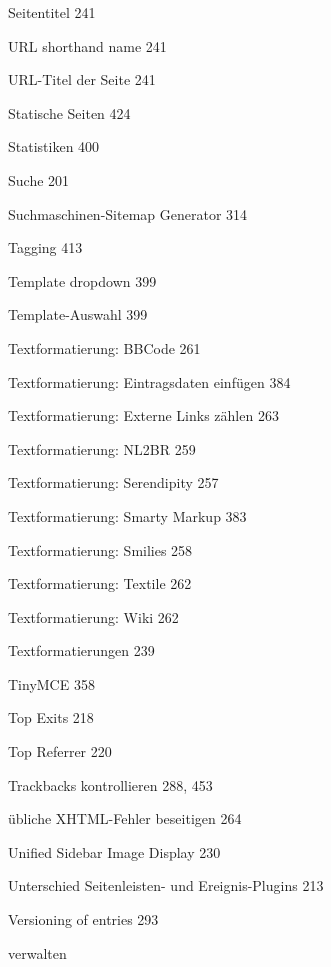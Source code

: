 \documentclass{book}
\renewcommand\subitem{\par}
\renewcommand\subsubitem{\par\hspace*{3mm}}
\begin{document}
\begin{multicols}{2}
\begin{osp-index}
      \subsubitem Seitentitel\hspace{1mm} 241
      \subsubitem URL shorthand name\hspace{1mm} 241
      \subsubitem URL-Titel der Seite\hspace{1mm} 241
    \subitem Statische Seiten\hspace{1mm} 424
    \subitem Statistiken\hspace{1mm} 400
    \subitem Suche\hspace{1mm} 201
    \subitem Suchmaschinen-Sitemap Generator\hspace{1mm} 314
    \subitem Tagging\hspace{1mm} 413
    \subitem Template dropdown\hspace{1mm} 399
    \subitem Template-Auswahl\hspace{1mm} 399
    \subitem Textformatierung: BBCode\hspace{1mm} 261
    \subitem Textformatierung: Eintragsdaten einf\"ugen\hspace{1mm} 384
    \subitem Textformatierung: Externe Links z\"ahlen\hspace{1mm} 263
    \subitem Textformatierung: NL2BR\hspace{1mm} 259
    \subitem Textformatierung: Serendipity\hspace{1mm} 257
    \subitem Textformatierung: Smarty Markup\hspace{1mm} 383
    \subitem Textformatierung: Smilies\hspace{1mm} 258
    \subitem Textformatierung: Textile\hspace{1mm} 262
    \subitem Textformatierung: Wiki\hspace{1mm} 262
    \subitem Textformatierungen\hspace{1mm} 239
    \subitem TinyMCE\hspace{1mm} 358
    \subitem Top Exits\hspace{1mm} 218
    \subitem Top Referrer\hspace{1mm} 220
    \subitem Trackbacks kontrollieren\hspace{1mm} 288, 453
    \subitem \"ubliche XHTML-Fehler beseitigen\hspace{1mm} 264
    \subitem Unified Sidebar Image Display\hspace{1mm} 230
    \subitem Unterschied Seitenleisten- und Ereignis-Plugins\hspace{1mm} 
		213
    \subitem Versioning of entries\hspace{1mm} 293
    \subitem verwalten\hspace{1mm} 

\end{osp-index}
\end{multicols}
\end{document}
